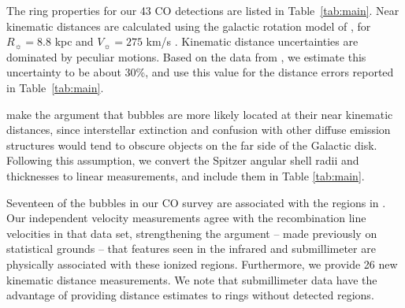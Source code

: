 The ring properties for our 43 CO detections are listed in
Table~\ref{tab:main}. Near kinematic distances are calculated using the galactic rotation
model of , for $R_{\sun} = 8.8$ kpc and
$V_{\sun} = 275$ km/s \citep{Reid09}. Kinematic distance
uncertainties are dominated by peculiar motions. Based on the data
from , we estimate this uncertainty to be about 30\%, and use this value for the
distance errors reported in Table~\ref{tab:main}.

 make the argument that bubbles are more
likely located at their near kinematic distances, since interstellar
extinction and confusion with other diffuse emission structures
would tend to obscure objects on the far side of the
Galactic disk. Following this assumption, we convert the Spitzer
angular shell radii and thicknesses to linear measurements, and
include them in Table \ref{tab:main}.

Seventeen of the bubbles in our CO survey are associated with the \hii regions in .
Our independent velocity measurements agree with the recombination line velocities in that data set,
strengthening the argument -- made previously on statistical
grounds -- that features seen in the infrared and submillimeter are
physically associated with these ionized regions. Furthermore, we
provide 26 new kinematic distance measurements.  We note that submillimeter data
have the advantage of providing distance estimates to rings without
detected \hii regions.

